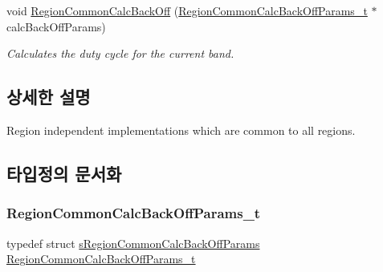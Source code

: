 \begin{DoxyCompactItemize}
void \mbox{\hyperlink{group___r_e_g_i_o_n_c_o_m_m_o_n_gae2b1dfba27c79f605048f2d9869dc57d}{Region\+Common\+Calc\+Back\+Off}} (\mbox{\hyperlink{group___r_e_g_i_o_n_c_o_m_m_o_n_ga26c2fc7c3e1d929d59b5653a5cd1fc0c}{Region\+Common\+Calc\+Back\+Off\+Params\+\_\+t}} $\ast$calc\+Back\+Off\+Params)
\begin{DoxyCompactList}\small\item\em Calculates the duty cycle for the current band. \end{DoxyCompactList}\end{DoxyCompactItemize}


\subsection{상세한 설명}
Region independent implementations which are common to all regions. 

\subsection{타입정의 문서화}
\mbox{\label{group___r_e_g_i_o_n_c_o_m_m_o_n_ga26c2fc7c3e1d929d59b5653a5cd1fc0c}} 
\subsubsection{\texorpdfstring{Region\+Common\+Calc\+Back\+Off\+Params\+\_\+t}{RegionCommonCalcBackOffParams\_t}}
{\footnotesize\ttfamily typedef struct \mbox{\hyperlink{structs_region_common_calc_back_off_params}{s\+Region\+Common\+Calc\+Back\+Off\+Params}} \mbox{\hyperlink{group___r_e_g_i_o_n_c_o_m_m_o_n_ga26c2fc7c3e1d929d59b5653a5cd1fc0c}{Region\+Common\+Calc\+Back\+Off\+Params\+\_\+t}}}

\mbox{\label{group___r_e_g_i_o_n_c_o_m_m_o_n_ga6e1aaa6b8d179e2daffac8d1e23d7f24}} 
